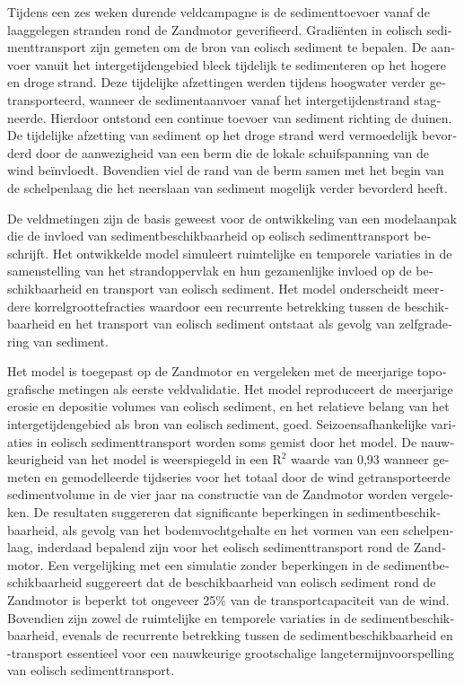 \begin{otherlanguage}{dutch}
Tijdens een zes weken durende veldcampagne is de sedimenttoevoer vanaf
de laaggelegen stranden rond de Zandmotor geverifieerd. Gradi{\"e}nten
in eolisch sedimenttransport zijn gemeten om de bron van eolisch
sediment te bepalen. De aanvoer vanuit het intergetijdengebied bleek
tijdelijk te sedimenteren op het hogere en droge strand. Deze
tijdelijke afzettingen werden tijdens hoogwater verder
getransporteerd, wanneer de sedimentaanvoer vanaf het
intergetijdenstrand stagneerde. Hierdoor ontstond een continue toevoer
van sediment richting de duinen. De tijdelijke afzetting van sediment
op het droge strand werd vermoedelijk bevorderd door de aanwezigheid
van een berm die de lokale schuifspanning van de wind
be{\"i}nvloedt. Bovendien viel de rand van de berm samen met het begin
van de schelpenlaag die het neerslaan van sediment mogelijk verder
bevorderd heeft.

De veldmetingen zijn de basis geweest voor de ontwikkeling van een
modelaanpak die de invloed van sedimentbeschikbaarheid op eolisch
sedimenttransport beschrijft. Het ontwikkelde model simuleert
ruimtelijke en temporele variaties in de samenstelling van het
strandoppervlak en hun gezamenlijke invloed op de beschikbaarheid en
transport van eolisch sediment. Het model onderscheidt meerdere
korrelgroottefracties waardoor een recurrente betrekking tussen de
beschikbaarheid en het transport van eolisch sediment ontstaat als
gevolg van zelfgradering van sediment.

Het model is toegepast op de Zandmotor en vergeleken met de meerjarige
topografische metingen als eerste veldvalidatie. Het model
reproduceert de meerjarige erosie en depositie volumes van eolisch
sediment, en het relatieve belang van het intergetijdengebied als bron
van eolisch sediment, goed. Seizoensafhankelijke variaties in eolisch
sedimenttransport worden soms gemist door het model. De nauwkeurigheid
van het model is weerspiegeld in een $\mathrm{R^2}$ waarde van 0,93
wanneer gemeten en gemodelleerde tijdseries voor het totaal door de
wind getransporteerde sedimentvolume in de vier jaar na constructie
van de Zandmotor worden vergeleken. De resultaten suggereren dat
significante beperkingen in sedimentbeschikbaarheid, als gevolg van
het bodemvochtgehalte en het vormen van een schelpenlaag, inderdaad
bepalend zijn voor het eolisch sedimenttransport rond de
Zandmotor. Een vergelijking met een simulatie zonder beperkingen in de
sedimentbeschikbaarheid suggereert dat de beschikbaarheid van eolisch
sediment rond de Zandmotor is beperkt tot ongeveer 25\% van de
transportcapaciteit van de wind. Bovendien zijn zowel de ruimtelijke
en temporele variaties in de sedimentbeschikbaarheid, evenals de
recurrente betrekking tussen de sedimentbeschikbaarheid en -transport
essentieel voor een nauwkeurige grootschalige langetermijnvoorspelling
van eolisch sedimenttransport.
\end{otherlanguage}


